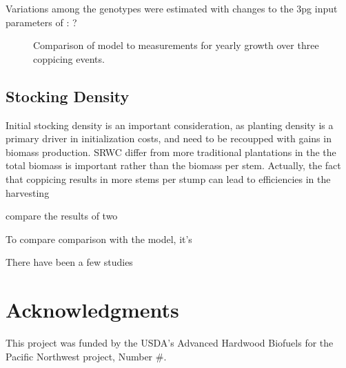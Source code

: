 \documentclass[10pt]{article}
\begin{document}
Variations among the genotypes were estimated with changes to the \ac{3pg}
input parameters of : ?

\begin{table}[!ht]
  \centering
    
  \caption{\ac{3pg} parameter variations of \ac{3pg} among genotypes}
  \label{tab:afas-3pg}
\end{table}

\begin{figure}[!ht]
  \centering

  \caption{Comparison of model to measurements for yearly growth over three
    coppicing events.}
\label{fig:afas-biomass}
\end{figure}

\subsection*{Stocking Density}
\label{sec:stocking-density}

Initial stocking density is an important consideration, as planting
density is a primary driver in initialization costs, and need to be
recoupped with gains in biomass production.  \ac{SRWC} differ from
more traditional plantations in the the total biomass is important
rather than the biomass per stem.  Actually, the fact that coppicing
results in more stems per stump can lead to efficiencies in the
harvesting 

\cite{proe02} compare the results of two 

To compare comparison with the
model, it's 

There have been a few studies



\section*{Acknowledgments}
This project was funded by the USDA's Advanced Hardwood Biofuels for
the Pacific Northwest project, Number \#.


\end{document}

